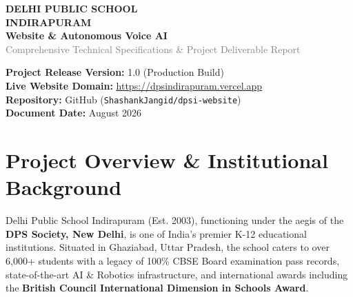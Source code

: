 \documentclass[11pt,a4paper]{article}
\begin{document}
\begin{titlepage}
    \thispagestyle{empty}
    \centering
    \vspace*{2.5cm}
    
    {\Huge \bfseries \textcolor{dpsemerald}{DELHI PUBLIC SCHOOL}}\\[0.2cm]
    {\Huge \bfseries \textcolor{dpsemerald}{INDIRAPURAM}}\\[0.8cm]
    
    {\Large \textbf{Website \& Autonomous Voice AI }}\\[0.4cm]
    {\large \textcolor{gray}{Comprehensive Technical Specifications \& Project Deliverable Report}}\\[2.5cm]
    
    \begin{tcolorbox}[colback=dpsemerald!8,colframe=dpsemerald,arc=5mm,width=0.85\textwidth,halign=center,boxrule=1.2pt]
        \vspace{0.4cm}
        {\Large \textbf{Project Release Version:}} 1.0 (Production Build)\\[0.25cm]
        {\Large \textbf{Live Website Domain:}} \url{https://dpsindirapuram.vercel.app}\\[0.25cm]
        {\Large \textbf{Repository:}} GitHub (\texttt{ShashankJangid/dpsi-website})\\[0.25cm]
        {\Large \textbf{Document Date:}} August 2026
        \vspace{0.4cm}
    \end{tcolorbox}
    
    \vfill
\end{titlepage}

\newpage
\tableofcontents
\newpage

\section{Project Overview \& Institutional Background}

Delhi Public School Indirapuram (Est. 2003), functioning under the aegis of the \textbf{DPS Society, New Delhi}, is one of India's premier K-12 educational institutions. Situated in Ghaziabad, Uttar Pradesh, the school caters to over 6,000+ students with a legacy of 100\% CBSE Board examination pass records, state-of-the-art AI \& Robotics infrastructure, and international awards including the \textbf{British Council International Dimension in Schools Award}.
\end{document}
